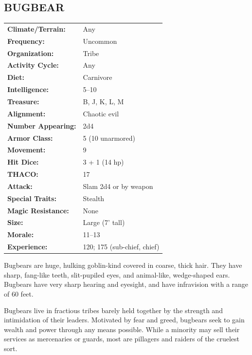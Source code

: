 \begin{multicols}{2}
\noindent
\begin{minipage}{\columnwidth}

\vspace{1em}

\subsection{BUGBEAR}

\noindent
\begin{tabular}{p{}p{}}
\textbf{Climate/Terrain:}	& Any \\
\textbf{Frequency:} 		& Uncommon \\
\textbf{Organization:} 		& Tribe \\
\textbf{Activity Cycle:} 	& Any \\
\textbf{Diet:} 				& Carnivore \\
\textbf{Intelligence:} 		& 5--10 \\
\textbf{Treasure:} 			& B, J, K, L, M \\
\textbf{Alignment:} 		& Chaotic evil \\
\hline
\textbf{Number Appearing:} 	& 2d4 \\
\textbf{Armor Class:} 		& 5 (10 unarmored) \\
\textbf{Movement:} 			& 9 \\
\textbf{Hit Dice:} 			& 3 + 1 (14 hp) \\
\textbf{THACO:} 			& 17 \\
\textbf{Attack:} 			& Slam 2d4 or by weapon \\
\textbf{Special Traits:} 	& Stealth \\
\textbf{Magic Resistance:} 	& None \\
\textbf{Size:} 				& Large (7' tall) \\
\textbf{Morale:} 			& 11--13 \\
\textbf{Experience:} 		& 120; 175 (sub-chief, chief) \\ %
\end{tabular}

\end{minipage}

Bugbears are huge, hulking goblin-kind covered in coarse, thick hair. They have sharp, fang-like teeth, slit-pupiled eyes, and animal-like, wedge-shaped ears. Bugbears have very sharp hearing and eyesight, and have infravision with a range of 60 feet.

Bugbears live in fractious tribes barely held together by the strength and intimidation of their leaders. Motivated by fear and greed, bugbears seek to gain wealth and power through any means possible. While a minority may sell their services as mercenaries or guards, most are pillagers and raiders of the cruelest sort.


\end{multicols}
